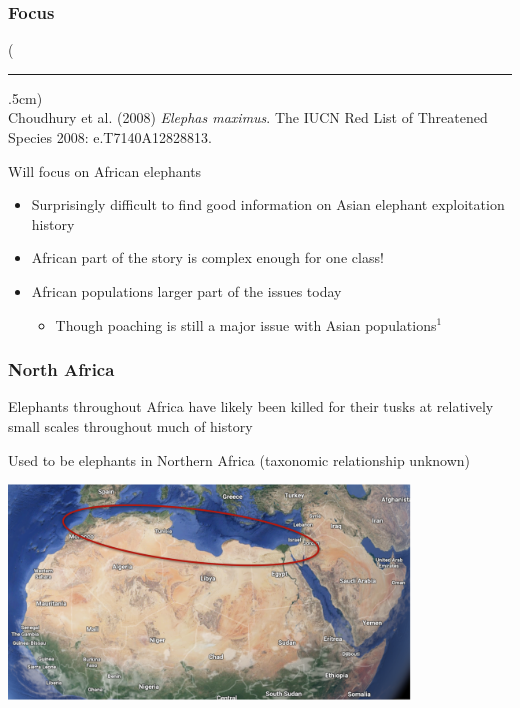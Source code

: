 \documentclass[10pt]{beamer}
\newenvironment{reference}[2]{%
	\begin{textblock*}{\textwidth}(#1,#2)
		\tiny\bgroup\color{gray}}{\egroup\end{textblock*}}
\begin{document}
\begin{frame}[t]
\frametitle{Focus}
\vspace{0.5cm}

	\begin{reference}{4mm}{90mm}
		\rule{1.5cm}{0.25pt}\\
		Choudhury et al. (2008) \emph{Elephas maximus}. The IUCN Red List of Threatened Species 2008: e.T7140A12828813.
	\end{reference}

	Will focus on \textcolor{myblue}{African} elephants
	
		\medskip
		
		\begin{itemize}
			\item Surprisingly difficult to find good information on Asian elephant exploitation history
			\medskip
			\item African part of the story is complex enough for one class!
			\medskip
			\item African populations larger part of the issues today
				\smallskip
				\begin{itemize}
					\item Though poaching is still a major issue with Asian populations$^{1}$
				\end{itemize}
		\end{itemize}

\end{frame}


\begin{frame}[t]
\frametitle{North Africa}
\vspace{0.5cm}
	
	Elephants throughout Africa have likely been killed for their tusks at relatively small scales throughout much of history\\
	
	\vspace{0.25cm}
	
	Used to be elephants in Northern Africa (taxonomic relationship unknown)\\
	
	\vspace{0.25cm}
	
	\begin{center}
		\includegraphics[width=0.8\textwidth]{figures/northern1.png}\\
	\end{center}	
\end{frame}
\end{document}
